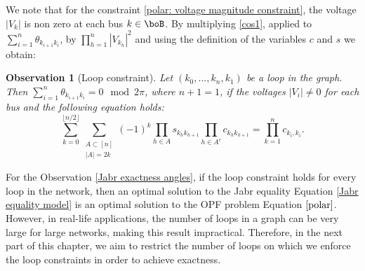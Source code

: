 \documentclass[11pt,a4paper,oneside,openany]{book}
\newtheorem{observation}[theorem]{Observation}
\numberwithin{definition}{section}
\numberwithin{theorem}{section}
\numberwithin{problem}{section}
\begin{document}
We note that for the constraint \eqref{polar: voltage magnitude constraint}, the voltage $|V_k|$ is non zero at each bus $k\in \boB$. By multiplying \eqref{cos1}, applied to $\sum_{i=1}^{n}\theta_{k_{i+1}k_i}$, by $\prod_{h=1}^n|V_{k_h}|^2$ and using the definition of the variables $c$ and $s$ we obtain:

\begin{observation}[Loop constraint]\label{loop constraint}
    Let $(k_0,...,k_n,k_1)$ be a loop in the graph. Then $\sum_{i=1}^{n}\theta_{k_{i+1}k_i}=0\mod 2\pi$, where $n+1=1$, if the voltages $|V_i|\neq 0$ for each bus and the following equation holds:
    \begin{equation}
        \sum_{k = 0}^{\lfloor n/2 \rfloor}\sum_{\substack{A \subset [n]\\|A|=2k}}(-1)^k\prod_{h \in A}s_{k_hk_{h+1}}\prod_{h \in A^c}c_{k_hk_{h+1}}=\prod_{k=1}^nc_{k_i,k_i}.
    \end{equation}
\end{observation}

For the Observation \ref{Jabr exactness angles}, if the loop constraint holds for every loop in the network, then an optimal solution to the Jabr equality Equation \eqref{Jabr equality model} is an optimal solution to the OPF problem Equation $\eqref{polar}$. However, in real-life applications, the number of loops in a graph can be very large for large networks, making this result impractical. Therefore, in the next part of this chapter, we aim to restrict the number of loops on which we enforce the loop constraints in order to achieve exactness.
\end{document}
